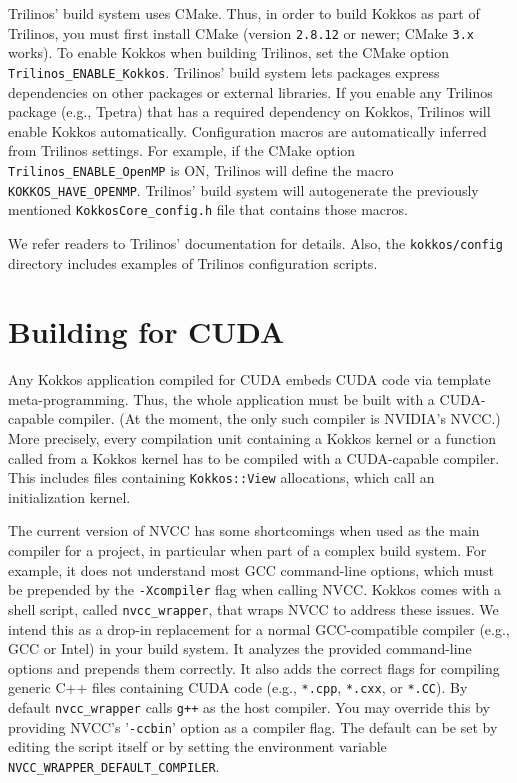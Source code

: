 Trilinos' build system uses CMake.  Thus, in order to build Kokkos as
part of Trilinos, you must first install CMake (version
\texttt{2.8.12} or newer; CMake \texttt{3.x} works).  
To enable Kokkos when building Trilinos, set the CMake option \verb!Trilinos_ENABLE_Kokkos!.
Trilinos' build system lets packages express dependencies on other packages or external libraries.
If you enable any Trilinos package (e.g., Tpetra) that has a required dependency on Kokkos, 
Trilinos will enable Kokkos automatically.
Configuration macros are automatically inferred from Trilinos settings. 
For example, if the CMake option \lstinline|Trilinos_ENABLE_OpenMP| is ON, Trilinos will define the macro \lstinline|KOKKOS_HAVE_OPENMP|.
Trilinos' build system will autogenerate the previously mentioned \lstinline|KokkosCore_config.h| file that contains those macros. 

We refer readers to Trilinos' documentation for details.  Also, the
\texttt{kokkos/config} directory includes examples of Trilinos
configuration scripts.
 
\section{Building for CUDA}\label{S:build:CUDA}

Any Kokkos application compiled for CUDA embeds CUDA code via template meta-programming.
Thus, the whole application must be built with a CUDA-capable compiler.
(At the moment, the only such compiler is NVIDIA's NVCC.)
More precisely, every compilation unit containing a Kokkos kernel or a function called from a Kokkos kernel has to be compiled with a CUDA-capable compiler. 
This includes files containing \lstinline|Kokkos::View| allocations, which call an initialization kernel. 

The current version of NVCC has some shortcomings when used as the main compiler for a project, in particular when part of a complex build system.
For example, it does not understand most GCC command-line options, which must be prepended by the \lstinline|-Xcompiler| flag when calling NVCC. 
Kokkos comes with a shell script, called \lstinline|nvcc_wrapper|, that wraps NVCC to address these issues.
We intend this as a drop-in replacement for a normal GCC-compatible compiler (e.g., GCC or Intel) in your build system.
It analyzes the provided command-line options and prepends them correctly. 
It also adds the correct flags for compiling generic C++ files containing CUDA code (e.g., \verb!*.cpp!, \verb!*.cxx!, or \verb!*.CC!).
By default \lstinline|nvcc_wrapper| calls \verb!g++! as the host compiler.
You may override this by providing NVCC's '\lstinline|-ccbin|' option as a compiler flag.
The default can be set by editing the script itself or by setting the environment variable \lstinline|NVCC_WRAPPER_DEFAULT_COMPILER|.

